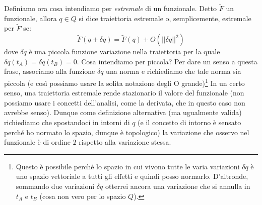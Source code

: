 \documentclass[a4paper,openany]{article}
\begin{document}
	Definiamo ora cosa intendiamo per \textit{estremale} di un funzionale. Detto $\tilde{F}$ un funzionale, allora $q\in Q$ si dice traiettoria estremale o, semplicemente, estremale per $\tilde{F}$ se:
	\begin{equation}\label{key}
		\tilde{F}(q+\delta q) = \tilde{F}(q) + O(||\delta q||^2)
	\end{equation}
	dove $\delta q$ è una piccola funzione variazione nella traiettoria per la quale $\delta q (t_A) = \delta q(t_B) = 0$. Cosa intendiamo per piccola? Per dare un senso a questa frase, associamo alla funzione $\delta q $ una norma e richiediamo che tale norma sia piccola (e così possiamo usare la solita notazione degli O grande)\footnote{Questo è possibile perché lo spazio in cui vivono tutte le varia variazioni $\delta q$ è uno spazio vettoriale a tutti gli effetti e quindi posso normarlo. D'altronde, sommando due variazioni $\delta q$ otterrei ancora una variazione che si annulla in $t_A \mbox{ e } t_B$ (cosa non vero per lo spazio $Q$).} In un certo senso, una traiettoria estremale rende stazionario il valore del funzionale (non possiamo usare i concetti dell'analisi, come la derivata, che in questo caso non avrebbe senso). Dunque come definizione alternativa (ma ugualmente valida) richiediamo che spostandoci in intorni di $q$ (e il concetto di intorno è sensato perché ho normato lo spazio, dunque è topologico) la variazione che osservo nel funzionale è di ordine $2$ rispetto alla variazione stessa. 
	
\end{document}
